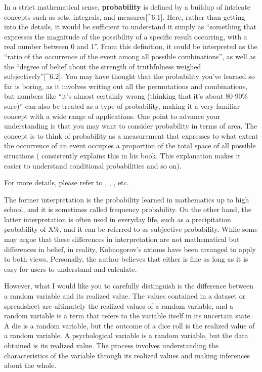 \documentclass[
  a4paper,
]{book}
\begin{document}
In a strict mathematical sense, \textbf{probability} is defined by a
buildup of intricate concepts such as sets, integrals, and
measures{[}\^{}6.1{]}. Here, rather than getting into the details, it
would be sufficient to understand it simply as ``something that
expresses the magnitude of the possibility of a specific result
occurring, with a real number between 0 and 1''. From this definition,
it could be interpreted as the ``ratio of the occurrence of the event
among all possible combinations'', as well as the ``degree of belief
about the strength of truthfulness weighed subjectively''{[}\^{}6.2{]}.
You may have thought that the probability you've learned so far is
boring, as it involves writing out all the permutations and
combinations, but numbers like ``it's almost certainly wrong (thinking
that it's about 80-90\% sure)'' can also be treated as a type of
probability, making it a very familiar concept with a wide range of
applications. One point to advance your understanding is that you may
want to consider probability in terms of area. The concept is to think
of probability as a measurement that expresses to what extent the
occurrence of an event occupies a proportion of the total space of all
possible situations (\textcite{Hiraoka200910} consistently explains this
in his book. This explanation makes it easier to understand conditional
probabilities and so on).

For more details, please refer to \textcite{Yoshida2021-02-25},
\textcite{Kono1999-05-01}, \textcite{Sato1994-02-25}, etc.

The former interpretation is the probability learned in mathematics up
to high school, and it is sometimes called frequency probability. On the
other hand, the latter interpretation is often used in everyday life,
such as a precipitation probability of X\%, and it can be referred to as
subjective probability. While some may argue that these differences in
interpretation are not mathematical but differences in belief, in
reality, Kolmogorov's axioms have been arranged to apply to both views.
Personally, the author believes that either is fine as long as it is
easy for users to understand and calculate.

However, what I would like you to carefully distinguish is the
difference between a random variable and its realized value. The values
contained in a dataset or spreadsheet are ultimately the realized values
of a random variable, and a random variable is a term that refers to the
variable itself in its uncertain state. A die is a random variable, but
the outcome of a dice roll is the realized value of a random variable. A
psychological variable is a random variable, but the data obtained is
its realized value. The process involves understanding the
characteristics of the variable through its realized values and making
inferences about the whole.
\end{document}
